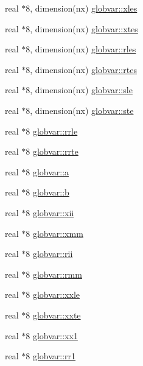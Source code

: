 \begin{DoxyCompactItemize}
\item 
real $\ast$8, dimension(nx) \hyperlink{namespaceglobvar_a836c8bf8d7637655fc19c4c13b925a62}{globvar\+::xles}
\item 
real $\ast$8, dimension(nx) \hyperlink{namespaceglobvar_a62fe8af457ae0993ea2e29369284a43c}{globvar\+::xtes}
\item 
real $\ast$8, dimension(nx) \hyperlink{namespaceglobvar_a94cb0237ff6d0453b0beb753150747e5}{globvar\+::rles}
\item 
real $\ast$8, dimension(nx) \hyperlink{namespaceglobvar_ae7e75a0af87d0417e4bdfbb7b813ea99}{globvar\+::rtes}
\item 
real $\ast$8, dimension(nx) \hyperlink{namespaceglobvar_a347bdab2ae7c615cda2ac9b23ac6f511}{globvar\+::sle}
\item 
real $\ast$8, dimension(nx) \hyperlink{namespaceglobvar_a27a2971e4137e1ce57e0f3241a027b28}{globvar\+::ste}
\item 
real $\ast$8 \hyperlink{namespaceglobvar_a600638b0ac89d9ce06362b3e345a247f}{globvar\+::rrle}
\item 
real $\ast$8 \hyperlink{namespaceglobvar_a6ca5b58308ba043d9dd929b77a5be5f6}{globvar\+::rrte}
\item 
real $\ast$8 \hyperlink{namespaceglobvar_a13851f46e6899d97ecaf2610a1d6f301}{globvar\+::a}
\item 
real $\ast$8 \hyperlink{namespaceglobvar_a8accedd2450a13e63eb70b05d0528797}{globvar\+::b}
\item 
real $\ast$8 \hyperlink{namespaceglobvar_a8d862a934e23da5ae319710a879706ba}{globvar\+::xii}
\item 
real $\ast$8 \hyperlink{namespaceglobvar_aab6536b56504cc8d4eafd8e083c061b3}{globvar\+::xmm}
\item 
real $\ast$8 \hyperlink{namespaceglobvar_a69c8e6a82732e6c3845873852cc473cb}{globvar\+::rii}
\item 
real $\ast$8 \hyperlink{namespaceglobvar_ab216d846edeea68aa1a53f31d84b33c0}{globvar\+::rmm}
\item 
real $\ast$8 \hyperlink{namespaceglobvar_ac2cc4848cc474dd9b462d3afc303ee1a}{globvar\+::xxle}
\item 
real $\ast$8 \hyperlink{namespaceglobvar_a126df8300f71cf717dece199b0a5478d}{globvar\+::xxte}
\item 
real $\ast$8 \hyperlink{namespaceglobvar_aabbafc0271d82fa75c53362dae7fd8e2}{globvar\+::xx1}
\item 
real $\ast$8 \hyperlink{namespaceglobvar_a2e507bd95b509159a6effc2df430ab18}{globvar\+::rr1}
\item 

\end{DoxyCompactItemize}
